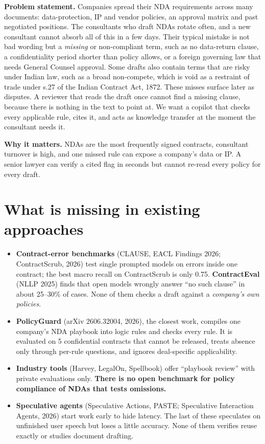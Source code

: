 \documentclass[11pt,a4paper]{article}
\begin{document}
\textbf{Problem statement.}
Companies spread their NDA requirements across many documents: data-protection, IP and vendor policies, an approval matrix and past negotiated positions.
The consultants who draft NDAs rotate often, and a new consultant cannot absorb all of this in a few days.
Their typical mistake is not bad wording but a \emph{missing} or non-compliant term, such as no data-return clause, a confidentiality period shorter than policy allows, or a foreign governing law that needs General Counsel approval.
Some drafts also contain terms that are risky under Indian law, such as a broad non-compete, which is void as a restraint of trade under s.27 of the Indian Contract Act, 1872.
These misses surface later as disputes.
A reviewer that reads the draft once cannot find a missing clause, because there is nothing in the text to point at.
We want a copilot that checks every applicable rule, cites it, and acts as knowledge transfer at the moment the consultant needs it.

\textbf{Why it matters.} NDAs are the most frequently signed contracts, consultant turnover is high, and one missed rule can expose a company's data or IP. A senior lawyer can verify a cited flag in seconds but cannot re-read every policy for every draft.

\section{What is missing in existing approaches}
\begin{itemize}
\item \textbf{Contract-error benchmarks} (CLAUSE, EACL Findings 2026; ContractScrub, 2026) test single prompted models on errors inside one contract; the best macro recall on ContractScrub is only 0.75. \textbf{ContractEval} (NLLP 2025) finds that open models wrongly answer ``no such clause'' in about 25--30\% of cases. None of them checks a draft against a \emph{company's own policies}.
\item \textbf{PolicyGuard} (arXiv 2606.32004, 2026), the closest work, compiles one company's NDA playbook into logic rules and checks every rule. It is evaluated on 5 confidential contracts that cannot be released, treats absence only through per-rule questions, and ignores deal-specific applicability.
\item \textbf{Industry tools} (Harvey, LegalOn, Spellbook) offer ``playbook review'' with private evaluations only. \textbf{There is no open benchmark for policy compliance of NDAs that tests omissions.}
\item \textbf{Speculative agents} (Speculative Actions, PASTE; Speculative Interaction Agents, 2026) start work early to hide latency. The last of these speculates on unfinished user speech but loses a little accuracy. None of them verifies reuse exactly or studies document drafting.
\end{itemize}
\end{document}
